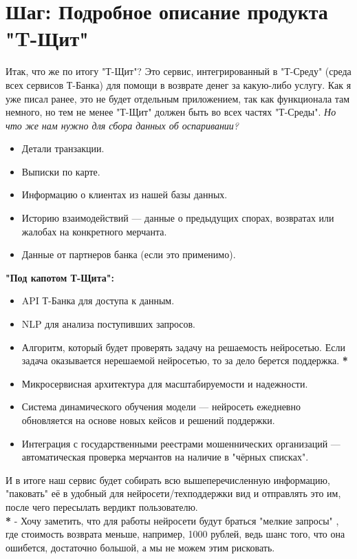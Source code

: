 \documentclass[12pt,a4paper]{article}
\begin{document}
\section{Шаг: Подробное описание продукта "T-Щит"}
Итак, что же по итогу "Т-Щит"? Это сервис, интегрированный в "Т-Среду" (среда всех сервисов Т-Банка) для помощи в возврате денег за какую-либо услугу. Как я уже писал ранее, это не будет отдельным приложением, так как функционала там немного, но тем не менее "Т-Щит" должен быть во всех частях "Т-Среды". \textit{Но что же нам нужно для сбора данных об оспаривании?}
\begin{itemize}
    \item Детали транзакции.
    \item Выписки по карте.
    \item Информацию о клиентах из нашей базы данных.
    \item Историю взаимодействий — данные о предыдущих спорах, возвратах или жалобах на конкретного мерчанта.
    \item Данные от партнеров банка (если это применимо).\\
\end{itemize}
\textbf{"Под капотом Т-Щита":}
\begin{itemize}
    \item API Т-Банка для доступа к данным.
    \item NLP для анализа поступивших запросов.
    \item Алгоритм, который будет проверять задачу на решаемость нейросетью. Если задача оказывается нерешаемой нейросетью, то за дело берется поддержка. \textbf{*}
    \item Микросервисная архитектура для масштабируемости и надежности.
    \item Система динамического обучения модели — нейросеть ежедневно обновляется на основе новых кейсов и решений поддержки.
    \item Интеграция с государственными реестрами мошеннических организаций — автоматическая проверка мерчантов на наличие в "чёрных списках".
\end{itemize}
И в итоге наш сервис будет собирать всю вышеперечисленную информацию, "паковать" \vspace{} 
её в удобный для нейросети/техподдержки вид и отправлять это им, после чего пересылать вердикт пользователю.\\

\textbf{*} - Хочу заметить, что для работы нейросети будут браться "мелкие запросы" \vspace{}, где стоимость возврата меньше, например, 1000 рублей, ведь шанс того, что она ошибется, достаточно большой, а мы не можем этим рисковать.
\end{document}
